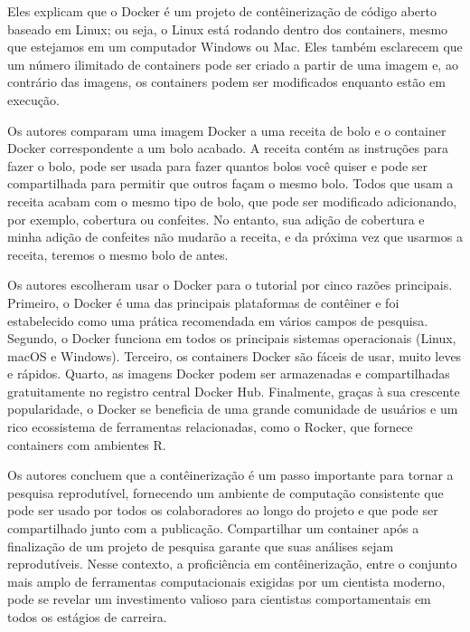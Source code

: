 \documentclass[
  a4paper,
]{article}
\begin{document}
\begin{tcolorbox}
Eles explicam que o Docker é um projeto de contêinerização de código
aberto baseado em Linux; ou seja, o Linux está rodando dentro dos
containers, mesmo que estejamos em um computador Windows ou Mac. Eles
também esclarecem que um número ilimitado de containers pode ser criado
a partir de uma imagem e, ao contrário das imagens, os containers podem
ser modificados enquanto estão em execução.

Os autores comparam uma imagem Docker a uma receita de bolo e o
container Docker correspondente a um bolo acabado. A receita contém as
instruções para fazer o bolo, pode ser usada para fazer quantos bolos
você quiser e pode ser compartilhada para permitir que outros façam o
mesmo bolo. Todos que usam a receita acabam com o mesmo tipo de bolo,
que pode ser modificado adicionando, por exemplo, cobertura ou
confeites. No entanto, sua adição de cobertura e minha adição de
confeites não mudarão a receita, e da próxima vez que usarmos a receita,
teremos o mesmo bolo de antes.

Os autores escolheram usar o Docker para o tutorial por cinco razões
principais. Primeiro, o Docker é uma das principais plataformas de
contêiner e foi estabelecido como uma prática recomendada em vários
campos de pesquisa. Segundo, o Docker funciona em todos os principais
sistemas operacionais (Linux, macOS e Windows). Terceiro, os containers
Docker são fáceis de usar, muito leves e rápidos. Quarto, as imagens
Docker podem ser armazenadas e compartilhadas gratuitamente no registro
central Docker Hub. Finalmente, graças à sua crescente popularidade, o
Docker se beneficia de uma grande comunidade de usuários e um rico
ecossistema de ferramentas relacionadas, como o Rocker, que fornece
containers com ambientes R.

Os autores concluem que a contêinerização é um passo importante para
tornar a pesquisa reprodutível, fornecendo um ambiente de computação
consistente que pode ser usado por todos os colaboradores ao longo do
projeto e que pode ser compartilhado junto com a publicação.
Compartilhar um container após a finalização de um projeto de pesquisa
garante que suas análises sejam reprodutíveis. Nesse contexto, a
proficiência em contêinerização, entre o conjunto mais amplo de
ferramentas computacionais exigidas por um cientista moderno, pode se
revelar um investimento valioso para cientistas comportamentais em todos
os estágios de carreira.

\end{tcolorbox}

\end{document}
